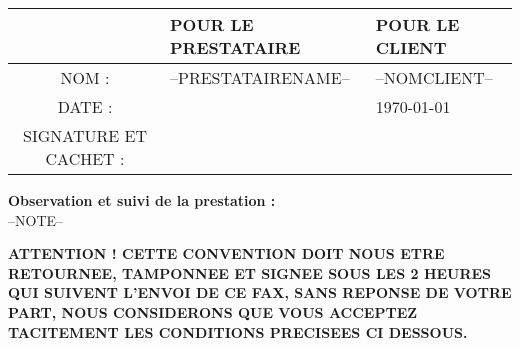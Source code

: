 \documentclass[a4paper, oneside, 8pt, french]{article}
\begin{document}
\begin{center}
\begin{tabular}{|c|p{6cm}|p{6cm}|}
\hline 
 & POUR LE PRESTATAIRE & POUR LE CLIENT \\ 
\hline
 NOM : & --PRESTATAIRENAME-- & --NOMCLIENT-- \\ 
\hline
DATE : &  & \today \\ 
\hline
SIGNATURE ET CACHET : &  &  
\\ [1cm]
\hline 
\end{tabular} 
\end{center}

\begin{fminipage}
\textbf{Observation et suivi de la prestation :} \\ 
--NOTE--
\end{fminipage}

\textbf{ATTENTION ! CETTE CONVENTION DOIT NOUS ETRE RETOURNEE, TAMPONNEE ET SIGNEE SOUS LES 2 HEURES QUI SUIVENT L'ENVOI DE CE FAX, SANS REPONSE DE VOTRE PART, NOUS CONSIDERONS QUE VOUS ACCEPTEZ TACITEMENT LES CONDITIONS PRECISEES CI DESSOUS.}
\end{document}
